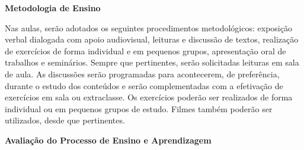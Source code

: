







\begin{snugshade}\begin{center}\textbf{
    Metodologia de Ensino
}\end{center}\end{snugshade}

\noindent
Nas aulas, serão adotados os seguintes procedimentos metodológicos: exposição verbal dialogada com apoio audiovisual, leituras e discussão de textos, realização de exercícios de forma individual e em pequenos grupos, apresentação oral de trabalhos e seminários. Sempre que pertinentes, serão solicitadas leituras em sala de aula. As discussões serão programadas para acontecerem, de preferência, durante o estudo dos conteúdos e serão complementadas com a efetivação de exercícios em sala ou extraclasse. Os exercícios poderão ser realizados de forma individual ou em pequenos grupos de estudo. Filmes também poderão ser utilizados, desde que pertinentes.

\begin{snugshade}\begin{center}\textbf{
    Avaliação do Processo de Ensino e Aprendizagem
}\end{center}\end{snugshade}

